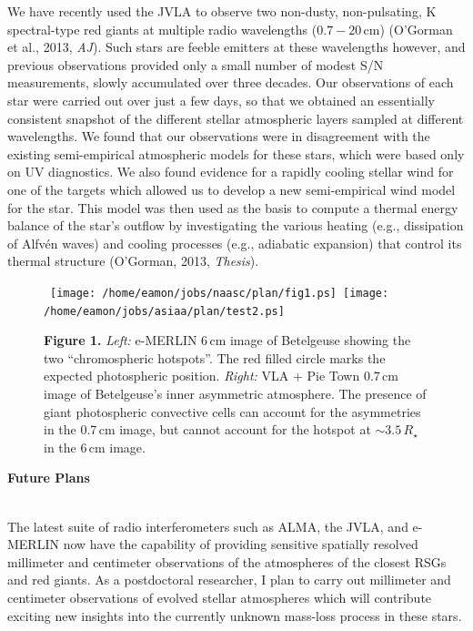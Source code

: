 \documentclass[11pt]{letter} %
\begin{document}
We have recently used the JVLA to observe two non-dusty, non-pulsating, K spectral-type red giants at multiple radio wavelengths ($0.7 - 20$\,cm) (O'Gorman et al., 2013, \textit{AJ}). Such stars are feeble emitters at these wavelengths however, and previous observations provided only a small number of modest S/N measurements, slowly accumulated over three decades. Our observations of each star were carried out over just a few days, so that we obtained an essentially consistent snapshot of the different stellar atmospheric layers sampled at different wavelengths. We found that our observations were in disagreement with the existing semi-empirical atmospheric models for these stars, which were based only on UV diagnostics. We also found evidence for a rapidly cooling stellar wind for one of the targets which allowed us to develop a new semi-empirical wind model for the star. This model was then used as the basis to compute a thermal energy balance of the star's outflow by investigating the various heating (e.g., dissipation of Alfv\'en waves) and cooling processes (e.g., adiabatic expansion) that control its thermal structure (O'Gorman, 2013, \textit{Thesis}). 

\begin{figure}[!t]
\centering 
\mbox{
          \texttt{[image: /home/eamon/jobs/naasc/plan/fig1.ps]}
          \texttt{[image: /home/eamon/jobs/asiaa/plan/test2.ps]}
          }
\caption{ {\small  \textbf{Figure 1.} \textit{Left:} e-MERLIN 6\,cm image of Betelgeuse showing the two ``chromospheric hotspots''. The red filled circle marks the expected photospheric position. \textit{Right:} VLA + Pie Town 0.7\,cm image of Betelgeuse's inner asymmetric atmosphere. The presence of giant photospheric convective cells can account for the asymmetries in the 0.7\,cm image, but cannot account for the hotspot at $\sim 3.5\,R_{\star}$ in the 6\,cm image.}}
\end{figure}

\begin{center}
\textbf{Future Plans}
\end{center}\\
The latest suite of radio interferometers such as ALMA, the JVLA, and e-MERLIN now have the capability of providing sensitive spatially resolved millimeter and centimeter observations of the atmospheres of the closest RSGs and red giants. As a postdoctoral researcher, I plan to carry out millimeter and centimeter observations of evolved stellar atmospheres which will contribute exciting new insights into the currently unknown mass-loss process in these stars. 
\end{document}
